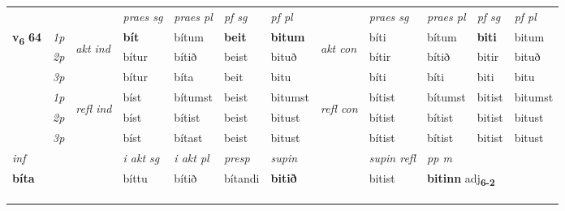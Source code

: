 \begin{longtable}[l]{X>{\footnotesize\itshape}llXXXXlXXXX}
 & &   & \textit{praes sg}  & \textit{praes pl}    & \textit{ pf sg} & \textit{pf pl} & & \textit{praes sg}  & \textit{praes pl}    & \textit{pf sg} & \textit{pf pl }  \\ \cmidrule{4-7} \cmidrule{9-12}
 \multirow{2}{*}{{{\textbf{v{\textsubscript{6}}} \Large{\textbf{64}}}}}  & 1p & \multirow{3}{*}{\begin{turn}{90}\textit{akt ind}\end{turn}} & \textbf{bít} & bítum & \textbf{beit} & \textbf{bitum} & \multirow{3}{*}{\begin{turn}{90}\textit{akt con}\end{turn}} &bíti & bítum & \textbf{biti} & bitum\\*
 & 2p &  &  bítur  & bítið & beist & bituð & & bítir & bítið & bitir & bituð \\*
 & 3p &  & bítur & bíta & beit & bitu & & bíti & bíti& biti & bitu \\*
\cmidrule{4-7} \cmidrule{9-12}
 & 1p & \multirow{3}{*}{\begin{turn}{90}\textit{refl ind}\end{turn}}  & bíst & bítumst & beist & bitumst & \multirow{3}{*}{\begin{turn}{90}\textit{refl con}\end{turn}}  &bítist & bítumst & bitist & bitumst \\*
 & 2p &  & bíst & bítist & beist & bitust & &bítist & bítist & bitist & bitust \\*
 & 3p  & & bíst & bítast & beist & bitust & & bítist & bítist& bitist & bitust \\*
\cmidrule{4-7} \cmidrule{9-12}

   {\textit{inf}} & &  & \textit{i akt sg} & \textit{i akt pl}   & \textit{presp} & \textit{supin} && \textit{supin refl} & \textit{pp m} \\*
  {\textbf{bíta}} & && bíttu  & bítið   & bítandi &  \textbf{bitið} && bitist & \multicolumn{2}{l}{\textbf{bitinn} adj\textbf{\textsubscript{6-2}}} \\*

\midrule
 & \\*
   & \\*
  & \\
   \midrule


\end{longtable}
